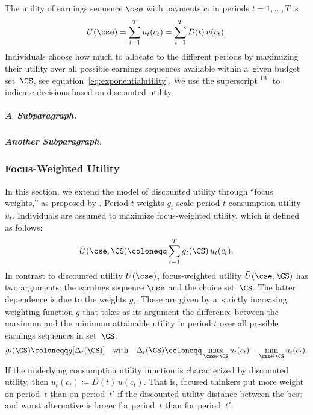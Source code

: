 The utility of earnings sequence $\cse$ with payments $c_t$ in periods $t = 1, \dots, T$ is
\begin{equation}
	\label{eq:exponentialutility}
	U(\cse) = \sum_{t=1}^{T} u_t(c_t) = \sum_{t=1}^{T} D(t)\,u(c_t).
\end{equation}
Individuals choose how much to allocate to the different periods by maximizing their utility over all possible earnings sequences available within a~given budget set~$\CS$, see equation~\eqref{eq:exponentialutility}. We use the superscript $^\mathrm{DU}$ to indicate decisions based on discounted utility.

\subparagraph{A~Subparagraph.}
\Blindtext[2]

\subparagraph{Another Subparagraph.}
\blindtext

\subsubsection{Focus-Weighted Utility}
In this section, we extend the model of discounted utility through ``focus weights,'' as proposed by \cite{Koszegi2013}. Period-$t$ weights $g_{t}$ scale period-$t$ consumption utility $u_t$. Individuals are assumed to maximize focus-weighted utility, which is defined as follows:
\begin{equation} \label{eq:focusutility}
	\tilde{U}(\cse, \CS) \coloneqq \sum_{t=1}^{T} g_t(\CS)\,u_t(c_t).
\end{equation}
In contrast to discounted utility $U(\cse)$, focus-weighted utility $\tilde{U}(\cse, \CS)$ has two arguments: the earnings sequence $\cse$ and the choice set~$\CS$. The latter dependence is due to the weights $g_t$. These are given by a~strictly increasing weighting function $g$ that takes as its argument the difference between the maximum and the minimum attainable utility in period $t$ over all possible earnings sequences in set~$\CS$:
\begin{equation} \label{eq:focusweight}
	g_t(\CS) \coloneqq g[\Delta_t(\CS)] \quad
	\text{with} \quad \Delta_t(\CS)
	\coloneqq
	\max\limits_{\cse \in \CS} u_t(c_t) - \min\limits_{\cse \in \CS} u_t(c_t).
\end{equation}
If the underlying consumption utility function is characterized by discounted utility, then ${u_t(c_t) \coloneqq D(t)\,u(c_t)}$.
That is, focused thinkers put more weight on period~$t$ than on period~$t'$ if the discounted-utility distance between the best and worst alternative is larger for period~$t$ than for period~$t'$.


